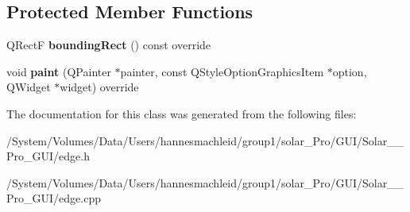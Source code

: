 \subsection*{Protected Member Functions}
\begin{DoxyCompactItemize}
\item 
\mbox{\label{class_edge_ac0666823dd663ff7f82d69a7801599e9}} 
Q\+RectF {\bfseries bounding\+Rect} () const override
\item 
\mbox{\label{class_edge_ad06d8c9648b5b008406cea84474ddfb8}} 
void {\bfseries paint} (Q\+Painter $\ast$painter, const Q\+Style\+Option\+Graphics\+Item $\ast$option, Q\+Widget $\ast$widget) override
\end{DoxyCompactItemize}


The documentation for this class was generated from the following files\+:\begin{DoxyCompactItemize}
\item 
/\+System/\+Volumes/\+Data/\+Users/hannesmachleid/group1/solar\+\_\+\+Pro/\+G\+U\+I/\+Solar\+\_\+\+\_\+\+Pro\+\_\+\+G\+U\+I/edge.\+h\item 
/\+System/\+Volumes/\+Data/\+Users/hannesmachleid/group1/solar\+\_\+\+Pro/\+G\+U\+I/\+Solar\+\_\+\+\_\+\+Pro\+\_\+\+G\+U\+I/edge.\+cpp\end{DoxyCompactItemize}

